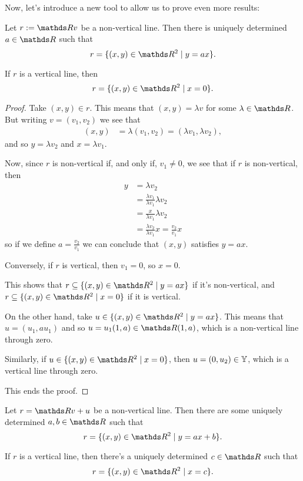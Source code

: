 Now, let's introduce a new tool to allow us to prove even more results:

\begin{prop}
	Let $r:=\R v$ be a non-vertical line. Then there is uniquely determined $a\in \R$ such that
	\[r=\{(x,y)\in \R^2\mid y=ax\}.\]
	
	If $r$ is a vertical line, then
	\[r=\{(x,y)\in \R^2\mid x=0\}.\]
\end{prop}
\begin{proof}
	Take $(x,y)\in r$. This means that $(x,y)=\lambda v$ for some $\lambda \in \R$. But writing $v=(v_1,v_2)$ we see that
	\begin{align*}
		(x,y)&=\lambda(v_1,v_2)=(\lambda v_1,\lambda v_2),
	\end{align*}and so $y=\lambda v_2$ and $x=\lambda v_1$. 
	
	Now, since $r$ is non-vertical if, and only if, $v_1\neq 0$, we see that if $r$ is non-vertical, then
	\begin{align*}
		y&=\lambda v_2\\
		&=\frac{\lambda v_1}{\lambda v_1}\lambda v_2\\
		&=\frac{x}{\lambda v_1}\lambda v_2\\
		&=\frac{\lambda v_2}{\lambda v_1}x=\frac{v_2}{v_1}x
	\end{align*}so if we define $a=\frac{v_2}{v_1}$ we can conclude that $(x,y)$ satisfies $y=ax$.
	
	Conversely, if $r$ is vertical, then $v_1=0$, so $x=0$.
	
	This shows that $r\subseteq\{(x,y)\in \R^2\mid y=ax\}$ if it's non-vertical, and $r\subseteq\{(x,y)\in \R^2\mid x=0\}$ if it is vertical.
	
	\bigskip
	On the other hand, take $u\in \{(x,y)\in \R^2\mid y=ax\}$. This means that $u=(u_1,au_1)$ and so $u=u_1(1,a)\in \R(1,a)$, which is a non-vertical line through zero.
	
	Similarly, if $u\in\{(x,y)\in \R^2\mid x=0\}$, then $u=(0,u_2)\in \mathbb Y$, which is a vertical line through zero.
	
	This ends the proof.
\end{proof}
\begin{cor}
	Let $r=\R v+u$ be a non-vertical line. Then there are some uniquely determined $a,b\in \R$ such that
	\[r=\{(x,y)\in \R^2\mid y=ax+b\}.\]
	
	If $r$ is a vertical line, then there's a uniquely determined $c\in \R$ such that
	\[r=\{(x,y)\in \R^2\mid x=c\}.\]
\end{cor}
